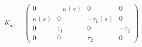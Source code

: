\begin{equation}\label{l81-9}
K_{ab}=
\left(\begin{array}{cccc}
 0 & -\kappa (s)& 0 & 0\\
\kappa (s)& 0 & -\tau _1 (s)& 0\\
0 & \tau _1 & 0 & -\tau _2\\
0 & 0 & \tau _ 2 & 0 \end{array} \right )
\end{equation}

